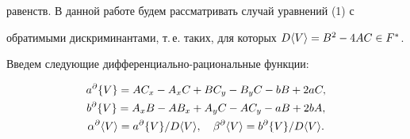 равенств. В данной работе будем рассматривать случай уравнений (1) с 


обратимыми дискриминантами, т.\,е. таких, для которых $D\la V 


\ra=\linebreak B^2-4A C\in F^*$. 


Введем следующие дифференциально-рациональные функции: 


\begin{gather*} 


a^\partial\{V\}=A C_x-A_x C+B C_y-B_y C-b B+2a C,\\ 


b^\partial\{V\}=A_x B-A B_x+A_y C- A C_y-a B+2b A,\\ 


\alpha^\partial\la V \ra=a^\partial\{V\}/D\la V \ra,\quad 


\beta^\partial\la V \ra=b^\partial\{V\}/D\la V \ra. 


\end{gather*} 


 


